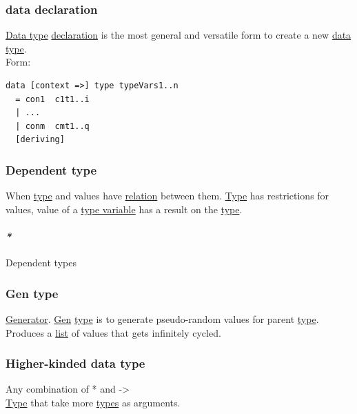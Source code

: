\documentclass[11pt]{article}
\begin{document}
\subsubsection{\label{org5326432}data declaration}
\label{sec:org40ea138}
\hyperref[org212d9c3]{Data type} \hyperref[org8fbd848]{declaration} is the most general and versatile form to create a new \hyperref[org212d9c3]{data type}.\\
Form:\\
\begin{verbatim}
data [context =>] type typeVars1..n
  = con1  c1t1..i
  | ...
  | conm  cmt1..q
  [deriving]
\end{verbatim}

\subsubsection{\label{org6fbf1b5}Dependent type}
\label{sec:orgbd3f85b}
When \hyperref[orgc4aea2f]{type} and values have \hyperref[orga5705a9]{relation} between them. \hyperref[orgc4aea2f]{Type} has restrictions for values, value of a \hyperref[org036d150]{type variable} has a result on the \hyperref[orgc4aea2f]{type}.\\

\paragraph{\emph{*}}
\label{sec:orgce896d5}

\label{orga9e0480}Dependent types\\

\subsubsection{\label{org162401e}Gen type}
\label{sec:orge17dea0}
\hyperref[org1fe413f]{Generator}. \hyperref[org63df282]{Gen} \hyperref[orgc4aea2f]{type} is to generate pseudo-random values for parent \hyperref[orgc4aea2f]{type}. Produces a \hyperref[org874a6e0]{list} of values that gets infinitely cycled.\\

\subsubsection{\label{org4243f05}Higher-kinded data type}
\label{sec:orgbcbf70a}
Any combination of * and ->\\

\hyperref[orgc4aea2f]{Type} that take more \hyperref[org4209edd]{types} as arguments.\\
\end{document}
